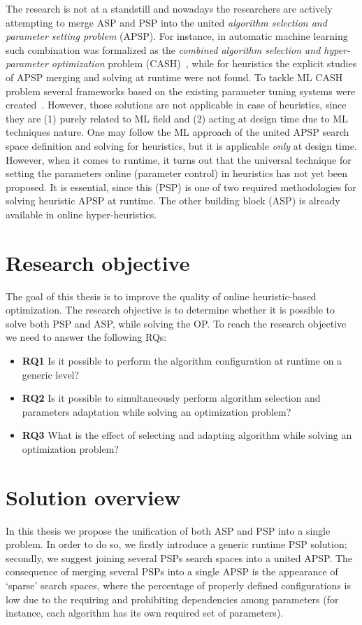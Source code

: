 The research is not at a standstill and nowadays the researchers are actively attempting to merge ASP and PSP into the united \emph{algorithm selection and parameter setting problem} (APSP). For instance, in automatic machine learning such combination was formalized as the \emph{combined algorithm selection and hyper-parameter optimization} problem (CASH)~\cite{thornton2013auto}, while for heuristics the explicit studies of APSP merging and solving at runtime were not found. To tackle ML CASH problem several frameworks based on the existing parameter tuning systems were created~\cite{thornton2013auto,feurer2015efficient,olson2019tpot}. However, those solutions are not applicable in case of heuristics, since they are (1) purely related to ML field and (2) acting at design time due to ML techniques nature. One may follow the ML approach of the united APSP search space definition and solving for heuristics, but it is applicable \emph{only} at design time. However, when it comes to runtime, it turns out that the universal technique for setting the parameters online (parameter control) in heuristics has not yet been proposed. It is essential, since this (PSP) is one of two required methodologies for solving heuristic APSP at runtime. The other building block (ASP) is already available in online hyper-heuristics.

\section{Research objective}\label{intro: research objective}
The goal of this thesis is to improve the quality of online heuristic-based optimization. The research objective is to determine whether it is possible to solve both PSP and ASP, while solving the OP. To reach the research objective we need to answer the following RQs:
\begin{itemize}
	\item \textbf{RQ1} Is it possible to perform the algorithm configuration at runtime on a generic level?
	
	\item \textbf{RQ2} Is it possible to simultaneously perform algorithm selection and parameters adaptation while solving an optimization problem?
	
	\item \textbf{RQ3} What is the effect of selecting and adapting algorithm while solving an optimization problem?
\end{itemize}


\section{Solution overview}
In this thesis we propose the unification of both ASP and PSP into a single problem. In order to do so, we firstly introduce a generic runtime PSP solution; secondly, we suggest joining several PSPs search spaces into a united APSP. The consequence of merging several PSPs into a single APSP is the appearance of `sparse' search spaces, where the percentage of properly defined configurations is low due to the requiring and prohibiting dependencies among parameters (for instance, each algorithm has its own required set of parameters).

